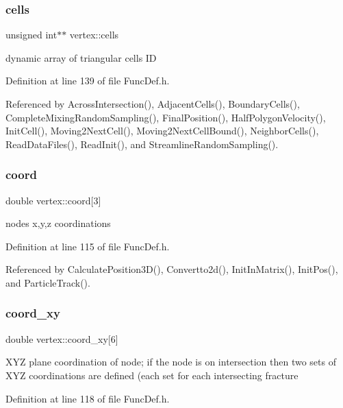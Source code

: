 \subsubsection{\texorpdfstring{cells}{cells}}
{\footnotesize\ttfamily unsigned int$\ast$$\ast$ vertex\+::cells}

dynamic array of triangular cells ID 

Definition at line 139 of file Func\+Def.\+h.



Referenced by Across\+Intersection(), Adjacent\+Cells(), Boundary\+Cells(), Complete\+Mixing\+Random\+Sampling(), Final\+Position(), Half\+Polygon\+Velocity(), Init\+Cell(), Moving2\+Next\+Cell(), Moving2\+Next\+Cell\+Bound(), Neighbor\+Cells(), Read\+Data\+Files(), Read\+Init(), and Streamline\+Random\+Sampling().

\mbox{\label{structvertex_a1eff0deab63f96c97ba5098608d65ad3}} 
\subsubsection{\texorpdfstring{coord}{coord}}
{\footnotesize\ttfamily double vertex\+::coord\mbox{[}3\mbox{]}}

node\textquotesingle{}s x,y,z coordinations 

Definition at line 115 of file Func\+Def.\+h.



Referenced by Calculate\+Position3\+D(), Convertto2d(), Init\+In\+Matrix(), Init\+Pos(), and Particle\+Track().

\mbox{\label{structvertex_a3473aebf2ce957df8c02095cc98ebb39}} 
\subsubsection{\texorpdfstring{coord\_xy}{coord\_xy}}
{\footnotesize\ttfamily double vertex\+::coord\+\_\+xy\mbox{[}6\mbox{]}}

X\+YZ plane coordination of node; if the node is on intersection then two sets of X\+YZ coordinations are defined (each set for each intersecting fracture 

Definition at line 118 of file Func\+Def.\+h.



